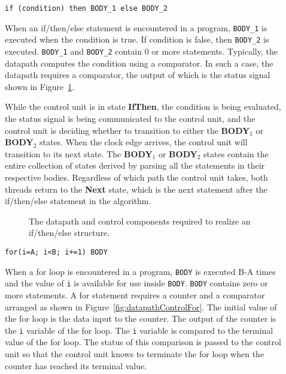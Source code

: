\begin{description}
\item[]\verb^if (condition) then BODY_1 else BODY_2^

When an if/then/else statement is encountered in a program, 
\verb^BODY_1^ is executed when the condition is true.  If condition 
is false, then \verb^BODY_2^ is executed.  \verb^BODY_1^ and \verb^BODY_2^ 
contain 0 or more statements.  Typically, the datapath computes 
the condition using a comparator.  In such a case, the datapath 
requires a comparator, the output of which is
the status signal shown in Figure~\ref{fig:datapathControlIfThen}.  

While the control unit is in state \textbf{ IfThen}, the condition 
is being evaluated, the status signal
is being communicated to the control unit, and the control
unit is deciding whether to transition to either the 
\textbf{ BODY}$_1$ or \textbf{ BODY}$_2$ states.  When the clock 
edge arrives, the control unit will transition to its next state.
The \textbf{ BODY}$_1$ or \textbf{ BODY}$_2$ states contain the entire 
collection of states derived by parsing all the statements in 
their respective bodies.  Regardless of which path the control 
unit takes, both threads return to the \textbf{ Next} state, which 
is the next statement after the if/then/else statement in the algorithm.

\begin{figure}[ht]
\caption{The datapath and control components required to realize
an if/then/else structure.}
\label{fig:datapathControlIfThen}
\end{figure}

\item[]\verb^for(i=A; i<B; i+=1) BODY^

When a for loop is encountered in a program, \verb^BODY^ is 
executed B-A times and the value of \verb^i^ is available 
for use inside \verb^BODY^.  \verb^BODY^ contains 
zero or more statements.  A for statement requires a counter and a 
comparator arranged as shown in Figure~\ref{fig:datapathControlFor}.  The initial
value of the for loop is the data input to the counter.  The 
output of the counter is the \verb+i+ variable of the for loop.  The
\verb+i+ variable is compared to the terminal value of the for loop.
The status of this comparison is passed to the control 
unit so that the control unit knows to terminate the for loop
when the counter has reached its terminal value.


\end{description}
